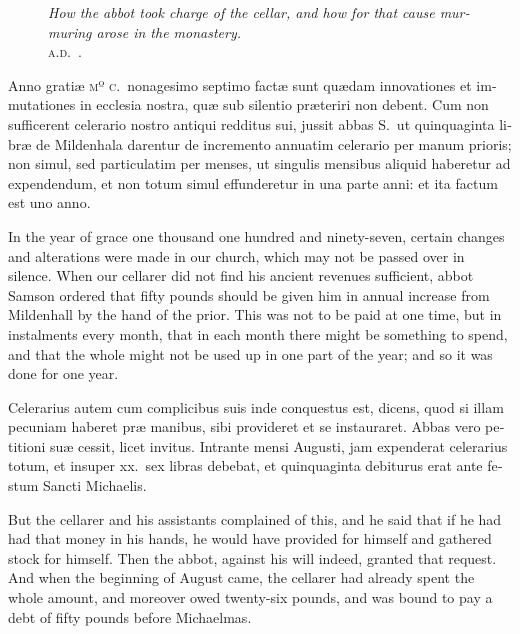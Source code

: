 \documentclass[10pt]{book}
\newcommand{\blockhead}[4][]{
\begin{figure}
\centering
\vspace{#4}
\parbox{2.75cm}{\begin{center}\footnotesize \color{BrickRed} \emph{#2}\\ #1 \end{center}}
\end{figure}
}
\begin{document}
\begin{paracol}{2}
\switchcolumn*

\begin{otherlanguage}{latin}
\blockhead[\textsc{a.d}.\ .]{How the abbot took charge of the cellar, and how for that cause murmuring arose in the monastery.}{5}{-.6cm} 
Anno grati\ae{} \textsc{mº c}.\ nonagesimo septimo fact\ae{} sunt qu\ae{}dam innovationes et immutationes in ecclesia nostra, qu\ae{} sub silentio pr\ae{}teriri non debent. Cum non sufficerent celerario nostro antiqui redditus sui, jussit abbas S.\ ut quinquaginta libr\ae{} de Mildenhala darentur de incremento annuatim celerario per manum prioris; non simul, sed particulatim per menses, ut singulis mensibus aliquid haberetur ad expendendum, et non totum simul effunderetur in una parte anni: et ita factum est uno anno.

\end{otherlanguage}

\switchcolumn

In the year of grace one thousand one hundred and ninety-seven, certain changes and alterations were made 
in our church, which may not be passed over in silence. When our cellarer did not find his ancient revenues sufficient, abbot Samson ordered that fifty pounds should be given him in annual increase from Mildenhall by the hand of the prior. This was not to be paid at one time, but in instalments every month, that in each month there might be something to spend, and that the whole might not be used up in one part of the year; and so it was done for one year.

\switchcolumn*

\begin{otherlanguage}{latin}
Celerarius autem cum complicibus suis inde conquestus est, dicens, quod si illam pecuniam haberet pr\ae{} manibus, sibi provideret et se instauraret. Abbas vero petitioni su\ae{} cessit, licet invitus. Intrante mensi Augusti, jam expenderat celerarius totum, et insuper xx.\ sex libras debebat, et quinquaginta debiturus erat ante festum Sancti Michaelis.
\end{otherlanguage}

\switchcolumn

But the cellarer and his assistants complained of this, and he said that if he had had that money in his hands, he would have provided for himself and gathered stock for himself. Then the abbot, against his will indeed, granted that request. And when the beginning of August came, the cellarer had already spent the whole amount, and moreover owed twenty-six pounds, and was bound to pay a debt of fifty pounds before Michaelmas.


\end{paracol}
\end{document}
